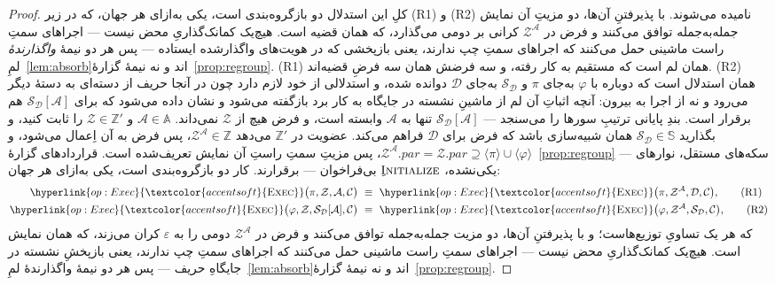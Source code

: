 \documentclass[10pt,oneside,openany]{book}
\newcommand{\pars}{\mathit{par}}
\newcommand{\Corr}{\mathcal{C}}
\newcommand{\Zenv}{\mathcal{Z}}
\newcommand{\Adv}{\mathcal{A}}
\newcommand{\Dum}{\mathcal{D}}
\newcommand{\Sim}{\mathcal{S}}
\newcommand{\Aset}{\mathbb{A}}
\newcommand{\SimSet}{\mathbb{S}}
\newcommand{\ZenvSet}{\mathbb{Z}}
\newcommand{\op}[1]{\textnormal{\textsc{#1}}}
\newcommand{\opl}[1]{\hyperlink{op:#1}{\textcolor{accentsoft}{\op{#1}}}}
\newcommand{\ncl}[1]{\langle #1 \rangle}
\theoremstyle{accentdef}
\theoremstyle{accentplain}
\begin{document}
\begin{proof}
کلِ این استدلال دو بازگروه‌بندی است، یکی به‌ازای هر جهان، که در زیر (R1) و
(R2) نامیده می‌شوند. با پذیرفتنِ آن‌ها، دو مزیتِ آن نمایش جمله‌به‌جمله
توافق می‌کنند و فرض در $\Zenv^{\Adv}$ کرانی بر دومی می‌گذارد، که همان
قضیه است. هیچ‌یک کمانک‌گذاریِ محض نیست --- اجراهای سمتِ راست ماشینی حمل
می‌کنند که اجراهای سمتِ چپ ندارند، یعنی بازپخشی که در هویت‌های واگذارشده
ایستاده --- پس هر دو نیمهٔ \emph{واگذارندهٔ} لمِ~\ref{lem:absorb}اند و نه
نیمهٔ گزارهٔ~\ref{prop:regroup}. (R1) همان لم است که مستقیم به کار رفته، و
سه فرضش همان سه فرضِ قضیه‌اند. (R2) همان استدلال است که دوباره با $\varphi$
به‌جای $\pi$ و $\Sim_{\Dum}$ به‌جای $\Dum$ دوانده شده، و استدلالی از خود
لازم دارد چون در آنجا حریف از دسته‌ای به دستهٔ دیگر می‌رود و نه از اجرا به
بیرون: آنچه اثباتِ آن لم از ماشینِ نشسته در جایگاه به کار برد بازگفته
می‌شود و نشان داده می‌شود که برای $\Sim_{\Dum}[\Adv]$ هم برقرار است. بندِ
پایانی ترتیبِ سورها را می‌سنجد --- $\Sim_{\Dum}[\Adv]$ تنها به $\Adv$
وابسته است، و فرض هیچ از $\Zenv$ نمی‌داند.
$\Adv \in \Aset$ و $\Zenv \in \ZenvSet'$ را ثابت کنید، و بگذارید
$\Sim_{\Dum} \in \SimSet$ همان شبیه‌سازی باشد که فرض برای $\Dum$ فراهم
می‌کند. عضویت در $\ZenvSet'$ می‌دهد $\Zenv^{\Adv} \in \ZenvSet$، پس فرض به
آن اِعمال می‌شود، و $\Zenv^{\Adv}.\pars = \Zenv.\pars \supseteq \ncl{\pi}
\cup \ncl{\varphi}$، پس مزیتِ سمتِ راستِ آن نمایش تعریف‌شده است.
قراردادهای گزارهٔ~\ref{prop:regroup} --- سکه‌های مستقل، نوارهای یکی‌نشده،
$\op{Initialize}$ِ بی‌فراخوان --- برقرارند. کار دو بازگروه‌بندی است، یکی
به‌ازای هر جهان:
\begin{align*}
  \opl{Exec}\bigl(\pi,\Zenv,\Adv,\Corr\bigr) &\ \equiv\ \opl{Exec}\bigl(\pi,\Zenv^{\Adv},\Dum,\Corr\bigr) , \tag{R1}\\
  \opl{Exec}\bigl(\varphi,\Zenv,\Sim_{\Dum}[\Adv],\Corr\bigr) &\ \equiv\ \opl{Exec}\bigl(\varphi,\Zenv^{\Adv},\Sim_{\Dum},\Corr\bigr) , \tag{R2}
\end{align*}
که هر یک تساویِ توزیع‌هاست؛ و با پذیرفتنِ آن‌ها، دو مزیت جمله‌به‌جمله توافق
می‌کنند و فرض در $\Zenv^{\Adv}$ دومی را به $\varepsilon$ کران می‌زند، که
همان نمایش است. هیچ‌یک کمانک‌گذاریِ محض نیست --- اجراهای سمتِ راست ماشینی
حمل می‌کنند که اجراهای سمتِ چپ ندارند، یعنی بازپخشِ نشسته در جایگاهِ حریف
--- پس هر دو نیمهٔ واگذارندهٔ لمِ~\ref{lem:absorb}اند و نه نیمهٔ
گزارهٔ~\ref{prop:regroup}.


\end{proof}
\end{document}
